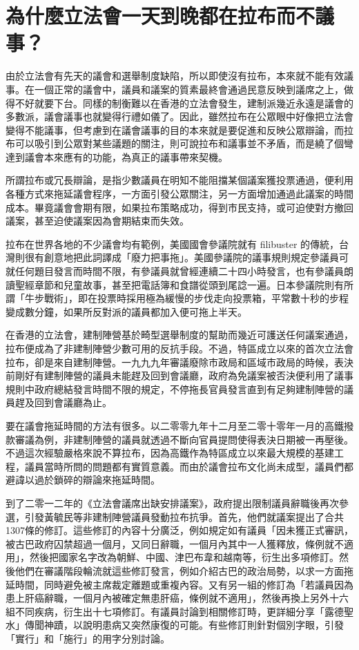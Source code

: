 \section{為什麼立法會一天到晚都在拉布而不議事？}
\label{sec:sec23}

由於立法會有先天的議會和選舉制度缺陷，所以即使沒有拉布，本來就不能有效議事。在一個正常的議會中，議員和議案的質素最終會通過民意反映到議席之上，做得不好就要下台。同樣的制衡難以在香港的立法會發生，建制派幾近永遠是議會的多數派，議會議事也就變得行禮如儀了。因此，雖然拉布在公眾眼中好像把立法會變得不能議事，但考慮到在議會議事的目的本來就是要促進和反映公眾辯論，而拉布可以吸引到公眾對某些議題的關注，則可說拉布和議事並不矛盾，而是繞了個彎達到議會本來應有的功能，為真正的議事帶來契機。

所謂拉布或冗長辯論，是指少數議員在明知不能阻擋某個議案獲投票通過，便利用各種方式來拖延議會程序，一方面引發公眾關注，另一方面增加通過此議案的時間成本。畢竟議會會期有限，如果拉布策略成功，得到市民支持，或可迫使對方撤回議案，甚至迫使議案因為會期結束而失效。

拉布在世界各地的不少議會均有範例，美國國會參議院就有 filibuster 的傳統，台灣則很有創意地把此詞譯成「廢力把事拖」。美國參議院的議事規則規定參議員可就任何題目發言而時間不限，有參議員就曾經連續二十四小時發言，也有參議員朗讀聖經章節和兒童故事，甚至把電話簿和食譜從頭到尾諗一遍。日本參議院則有所謂「牛步戰術」，即在投票時採用極為緩慢的步伐走向投票箱，平常數十秒的步程變成數分鐘，如果所反對派的議員都加入便可拖上半天。

在香港的立法會，建制陣營基於畸型選舉制度的幫助而幾近可護送任何議案通過，拉布便成為了非建制陣營少數可用的反抗手段。不過，特區成立以來的首次立法會拉布，卻是來自建制陣營。一九九九年審議廢除市政局和區域市政局的時候，表決前剛好有建制陣營的議員未能趕及回到會議廳，政府為免議案被否決便利用了議事規則中政府總結發言時間不限的規定，不停拖長官員發言直到有足夠建制陣營的議員趕及回到會議廳為止。

要在議會拖延時間的方法有很多。以二零零九年十二月至二零十零年一月的高鐵撥款審議為例，非建制陣營的議員就透過不斷向官員提問使得表決日期被一再壓後。不過這次經驗嚴格來說不算拉布，因為高鐵作為特區成立以來最大規模的基建工程，議員當時所問的問題都有實質意義。而由於議會拉布文化尚未成型，議員們都避諱以過於鎖碎的辯論來拖延時間。

到了二零一二年的《立法會議席出缺安排議案》，政府提出限制議員辭職後再次參選，引發黃毓民等非建制陣營議員發動拉布抗爭。首先，他們就議案提出了合共1307條的修訂。這些修訂的內容十分廣泛，例如規定如有議員「因未獲正式審訊，被古巴政府囚禁超過一個月，又同日辭職，一個月內其中一人獲釋放，條例就不適用」，然後把國家名字改為朝鮮、中國、津巴布韋和越南等，衍生出多項修訂。然後他們在審議階段輪流就這些修訂發言，例如介紹古巴的政治局勢，以求一方面拖延時間，同時避免被主席裁定離題或重複內容。又有另一組的修訂為「若議員因為患上肝癌辭職，一個月內被確定無患肝癌，條例就不適用」，然後再換上另外十六組不同疾病，衍生出十七項修訂。有議員討論到相關修訂時，更詳細分享「露德聖水」傳聞神蹟，以說明患病又突然康復的可能。有些修訂則針對個別字眼，引發「實行」和「施行」的用字分別討論。

